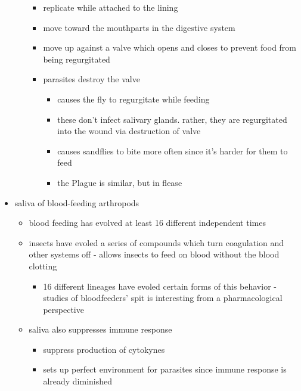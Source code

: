 \documentclass{article}
\begin{document}
\begin{itemize}
\begin{itemize}
            \begin{itemize}
                \item replicate while attached to the lining
                \item move toward the mouthparts in the digestive system
                \item move up against a valve which opens and closes to prevent food from being regurgitated
                \item parasites destroy the valve
                \begin{itemize}
                    \item causes the fly to regurgitate while feeding
                    \item these don't infect salivary glands.  rather, they are regurgitated into the wound via destruction of valve
                    \item causes sandflies to bite more often since it's harder for them to feed
                    \item the Plague is similar, but in flease
                \end{itemize}
            \end{itemize}
        \end{itemize}
        \item saliva of blood-feeding arthropods
        \begin{itemize}
            \item blood feeding has evolved at least 16 different independent times
            \item insects have evoled a series of compounds which turn coagulation and other systems off - allows insects to feed on blood without the blood clotting
            \begin{itemize}
                \item 16 different lineages have evoled certain forms of this behavior - studies of bloodfeeders' spit is interesting from a pharmacological perspective
            \end{itemize}
            \item saliva also suppresses immune response
            \begin{itemize}
                \item suppress production of cytokynes
                \item sets up perfect environment for parasites since immune response is already diminished
            \end{itemize}

\end{itemize}
\end{itemize}
\end{document}

